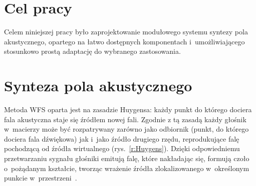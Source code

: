 \documentclass[10pt, a4paper]{article}
\let\Oldsection\section
\renewcommand{\section}{\FloatBarrier\Oldsection}
\begin{document}
\section{Cel pracy}

Celem niniejszej pracy było zaprojektowanie modułowego systemu
syntezy pola akustycznego, opartego na łatwo dostępnych komponentach
i~umożliwiającego stosunkowo prostą adaptację do wybranego zastosowania.

\section{Synteza pola akustycznego}

Metoda WFS oparta jest na zasadzie Huygensa: każdy punkt do którego dociera
fala akustyczna staje się źródłem nowej fali. Zgodnie z tą zasadą każdy głośnik
w~macierzy może być rozpatrywany zarówno jako odbiornik (punkt, do którego dociera 
fala dźwiękowa) jak i~jako źródło drugiego rzędu, reprodukujące falę pochodzącą od 
źródła wirtualnego (rys.~\ref{r:Huygens}). Dzięki odpowiedniemu przetwarzaniu sygnału głośniki emitują
falę, które nakładając się, formują czoło o~pożądanym kształcie, tworząc wrażenie
źródła zlokalizowanego w~określonym punkcie w~przestrzeni~\cite{hq_rendering}.
\end{document}
